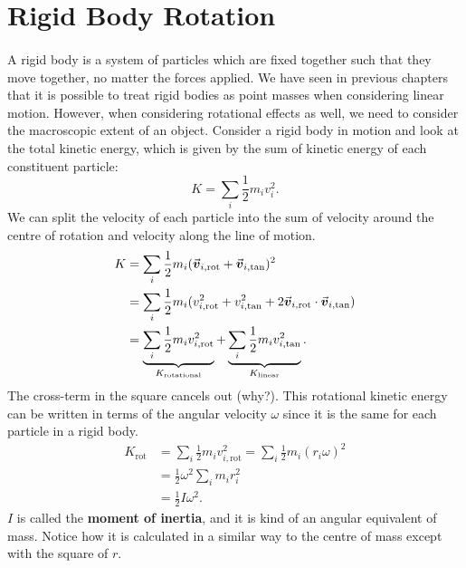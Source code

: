 \documentclass[../newtonian_mechanics.tex]{subfiles}
\begin{document}
    \section{Rigid Body Rotation}
        \paragraph{}
        A rigid body is a system of particles which are fixed together such that they move together, no matter the forces applied.
        We have seen in previous chapters that it is possible to treat rigid bodies as point masses when considering linear motion.
        However, when considering rotational effects as well, we need to consider the macroscopic extent of an object.
        Consider a rigid body in motion and look at the total kinetic energy, which is given by the sum of kinetic energy of each constituent particle:
        \begin{equation}
            K=\sum_i\frac{1}{2}m_iv_i^2.
        \end{equation}
        We can split the velocity of each particle into the sum of velocity around the centre of rotation and velocity along the line of motion.
        \begin{align}
            K&=\sum_i\frac{1}{2}m_i(\vec{\boldsymbol v}_{i,\text{rot}}+\vec{\boldsymbol v}_{i,\text{tan}})^2\\
            &=\sum_i\frac{1}{2}m_i(v_{i,\text{rot}}^2+v_{i,\text{tan}}^2+2\vec{\boldsymbol v}_{i,\text{rot}}\cdot\vec{\boldsymbol v}_{i,\text{tan}})\\
            &=\underbrace{\sum_i\frac{1}{2}m_iv_{i,\text{rot}}^2}_{K_\text{rotational}}+\underbrace{\sum_i\frac{1}{2}m_iv_{i,\text{tan}}^2}_{K_\text{linear}}.
        \end{align}
        The cross-term in the square cancels out (why?).
        This rotational kinetic energy can be written in terms of the angular velocity $\omega$ since it is the same for each particle in a rigid body.
        \begin{align}
            K_\text{rot}&=\sum_i\frac{1}{2}m_iv_{i,\text{rot}}^2=\sum_i\frac{1}{2}m_i(r_i\omega)^2\\
            &=\frac{1}{2}\omega^2\sum_i m_ir_i^2\\
            &=\frac{1}{2}I\omega^2.
        \end{align}
        $I$ is called the \textbf{moment of inertia}, and it is kind of an angular equivalent of mass.
        Notice how it is calculated in a similar way to the centre of mass except with the square of $r$.
\end{document}
